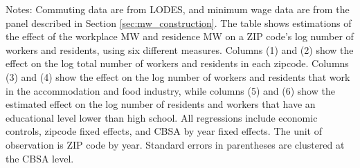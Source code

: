 \begin{table}[hbt!]
    \begin{minipage}{.95\textwidth} \footnotesize
        \vspace{2mm}
        Notes: Commuting data are from LODES, and minimum wage 
        data are from the panel described in Section \ref{sec:mw_construction}.
        The table shows estimations of the effect of the workplace MW and
        residence MW on a ZIP code's log number of workers and residents, 
        using six different measures. 
        Columns (1) and (2) show the effect on the log total number of workers 
        and residents in each zipcode.
        Columns (3) and (4) show the effect on the log number of workers and 
        residents that work in the accommodation and food industry, while 
        columns (5) and (6) show the estimated effect on the log number of 
        residents and workers that have an educational level lower than high 
        school. 
        All regressions include economic controls, zipcode fixed effects, 
        and CBSA by year fixed effects.
        The unit of observation is ZIP code by year.
        Standard errors in parentheses are clustered at the CBSA level.
    \end{minipage}
\end{table}
